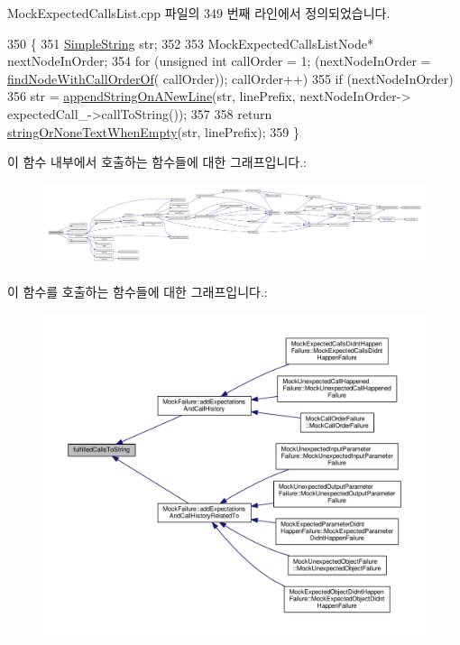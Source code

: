 Mock\+Expected\+Calls\+List.\+cpp 파일의 349 번째 라인에서 정의되었습니다.


\begin{DoxyCode}
350 \{
351     \hyperlink{class_simple_string}{SimpleString} str;
352 
353     MockExpectedCallsListNode* nextNodeInOrder;
354     \textcolor{keywordflow}{for} (\textcolor{keywordtype}{unsigned} \textcolor{keywordtype}{int} callOrder = 1; (nextNodeInOrder = \hyperlink{class_mock_expected_calls_list_ac9399ef4ecb1468ef6e350629bdecc39}{findNodeWithCallOrderOf}(
      callOrder)); callOrder++)
355         \textcolor{keywordflow}{if} (nextNodeInOrder)
356             str = \hyperlink{_mock_expected_calls_list_8cpp_ad685c47d9d5b72d8795c6222c253fb42}{appendStringOnANewLine}(str, linePrefix, nextNodeInOrder->
      expectedCall\_->callToString());
357 
358     \textcolor{keywordflow}{return} \hyperlink{_mock_expected_calls_list_8cpp_a7ebf45e0b27acb5af762aab72666fe40}{stringOrNoneTextWhenEmpty}(str, linePrefix);
359 \}
\end{DoxyCode}


이 함수 내부에서 호출하는 함수들에 대한 그래프입니다.\+:
\nopagebreak
\begin{figure}[H]
\begin{center}
\leavevmode
\includegraphics[width=350pt]{class_mock_expected_calls_list_a66959cff61f39f0857b2523e000c1e8c_cgraph}
\end{center}
\end{figure}




이 함수를 호출하는 함수들에 대한 그래프입니다.\+:
\nopagebreak
\begin{figure}[H]
\begin{center}
\leavevmode
\includegraphics[width=350pt]{class_mock_expected_calls_list_a66959cff61f39f0857b2523e000c1e8c_icgraph}
\end{center}
\end{figure}


